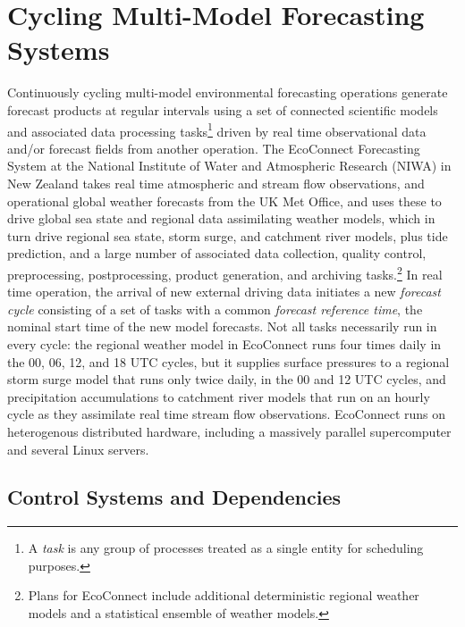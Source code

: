 \documentclass[11pt,a4paper]{article}
\begin{document}
\pagebreak
\tableofcontents
\pagebreak

\section{Cycling Multi-Model Forecasting Systems}

Continuously cycling multi-model environmental forecasting operations
generate forecast products at regular intervals using a set of connected
scientific models and associated data processing tasks\footnote{A {\em
task} is any group of processes treated as a single entity for
scheduling purposes.} driven by real time observational data and/or
forecast fields from another operation. The EcoConnect Forecasting
System at the National Institute of Water and Atmospheric Research
(NIWA) in New Zealand takes real time atmospheric and stream flow
observations, and operational global weather forecasts from the UK Met
Office, and uses these to drive global sea state and regional data
assimilating weather models, which in turn drive regional sea state,
storm surge, and catchment river models, plus tide prediction, and a
large number of associated data collection, quality control,
preprocessing, postprocessing, product generation, and archiving
tasks.\footnote{Plans for EcoConnect include additional deterministic
regional weather models and a statistical ensemble of weather models.}
In real time operation, the arrival of new external driving data
initiates a new {\em forecast cycle} consisting of a set of tasks with a
common {\em forecast reference time}, the nominal start time of the new
model forecasts. Not all tasks necessarily run in every cycle: the
regional weather model in EcoConnect runs four times daily in the 00,
06, 12, and 18 UTC cycles, but it supplies surface pressures to a
regional storm surge model that runs only twice daily, in the 00 and 12
UTC cycles, and precipitation accumulations to catchment river models
that run on an hourly cycle as they assimilate real time stream flow
observations.  EcoConnect runs on heterogenous distributed hardware,
including a massively parallel supercomputer and several Linux servers. 

\subsection{Control Systems and Dependencies}
\end{document}
